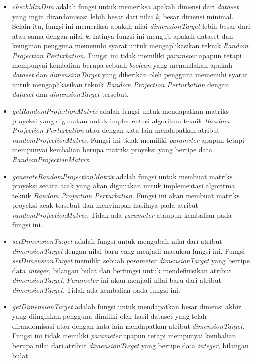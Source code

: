 \begin{itemize}
	\item \textit{checkMinDim} adalah fungsi untuk memeriksa apakah dimensi dari \textit{dataset} yang ingin dirandomisasi lebih besar dari nilai \textit{k}, besar dimensi minimal. Selain itu, fungsi ini memeriksa apakah nilai \textit{dimensionTarget} lebih besar dari atau sama dengan nilai \textit{k}. Intinya fungsi ini menguji apakah dataset dan keinginan pengguna memenuhi syarat untuk mengaplikasikan teknik \textit{Random Projection Perturbation}. Fungsi ini tidak memiliki \textit{parameter} apapun tetapi mempunyai kembalian berupa sebuah \textit{boolean} yang menandakan apakah \textit{dataset} dan \textit{dimensionTarget} yang diberikan oleh pengguna memenuhi syarat untuk mengaplikasikan teknik \textit{Random Projection Perturbation} dengan \textit{dataset} dan \textit{dimensionTarget} tersebut.
	\item \textit{getRandomProjectionMatrix} adalah fungsi untuk mendapatkan matriks proyeksi yang digunakan untuk implementasi algoritma teknik \textit{Random Projection Perturbation} atau dengan kata lain mendapatkan atribut \textit{randomProjectionMatrix}. Fungsi ini tidak memiliki \textit{parameter} apapun tetapi mempunyai kembalian berupa matriks proyeksi yang bertipe data \textit{RandomProjectionMatrix}.
	\item \textit{generateRandomProjectionMatrix} adalah fungsi untuk membuat matriks proyeksi secara acak yang akan digunakan untuk implementasi algoritma teknik \textit{Random Projection Perturbation}. Fungsi ini akan membuat matriks proyeksi acak tersebut dan menyimpan hasilnya pada atribut \textit{randomProjectionMatrix}. Tidak ada \textit{parameter} ataupun kembalian pada fungsi ini.
	\item \textit{setDimensionTarget} adalah fungsi untuk mengubah nilai dari atribut \textit{dimensionTarget} dengan nilai baru yang menjadi masukan fungsi ini. Fungsi \textit{setDimensionTarget} memiliki sebuah \textit{parameter} \textit{dimensionTarget} yang bertipe data \textit{integer}, bilangan bulat dan berfungsi untuk mendefinisikan atribut \textit{dimensionTarget}. \textit{Parameter} ini akan menjadi nilai baru dari atribut \textit{dimensionTarget}. Tidak ada kembalian pada fungsi ini.
	\item \textit{getDimensionTarget} adalah fungsi untuk mendapatkan besar dimensi akhir yang diinginkan pengguna dimiliki oleh hasil dataset yang telah dirandomisasi atau dengan kata lain mendapatkan atribut \textit{dimensionTarget}. Fungsi ini tidak memiliki \textit{parameter} apapun tetapi mempunyai kembalian berupa nilai dari atribut \textit{dimensionTarget} yang bertipe data \textit{integer}, bilangan bulat.
\end{itemize}